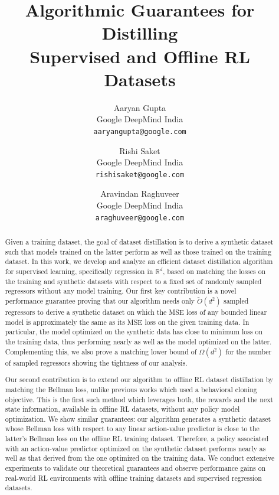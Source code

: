 \documentclass{article}
\title{Algorithmic Guarantees for Distilling \\ Supervised and Offline RL Datasets}
\author{%
Aaryan Gupta \\ Google DeepMind India \\  {\tt aaryangupta@google.com}
\and
Rishi Saket \\ Google DeepMind India \\ {\tt rishisaket@google.com}
\and
Aravindan Raghuveer \\ Google DeepMind India \\ {\tt araghuveer@google.com}
}
\theoremstyle{plain}
\theoremstyle{definition}
\theoremstyle{remark}
\begin{document}
\maketitle


\begin{abstract}
Given a training dataset, the goal of dataset distillation is to derive a synthetic dataset such that models trained on the latter perform as well as those trained on the training dataset. In this work, we develop and analyze an efficient dataset distillation algorithm for supervised learning, specifically regression in $\mathbb{R}^d$, based on matching the losses on the training and synthetic datasets with respect to a fixed set of randomly sampled regressors without any model training. Our first key contribution is a novel performance guarantee proving that our algorithm needs only $\tilde{O}(d^2)$ sampled regressors to derive a synthetic dataset on which the MSE loss of any bounded linear model is approximately the same as its MSE loss on the given training data. In particular, the model optimized on the synthetic data has close to minimum loss on the training data, thus performing nearly as well as the model optimized on the latter. Complementing this, we also prove a matching lower bound of $\Omega(d^2)$ for the number of sampled regressors showing the tightness of our analysis.

Our second contribution is to extend our algorithm to offline RL dataset distillation by matching the Bellman loss, unlike previous works which used a behavioral cloning objective. This is the first such method which leverages both, the rewards and the next state information, available in offline RL datasets, without any policy model optimization. We show similar guarantees: our algorithm generates a synthetic dataset whose Bellman loss with respect to any linear action-value predictor is close to the latter’s Bellman loss on the offline RL training dataset. Therefore, a policy associated with an action-value predictor optimized on the synthetic dataset performs nearly as well as that derived from the one optimized on the training data. We conduct extensive experiments to validate our theoretical guarantees and observe performance gains on real-world RL environments with offline training datasets and supervised regression datasets.
\end{abstract}







\end{document}
